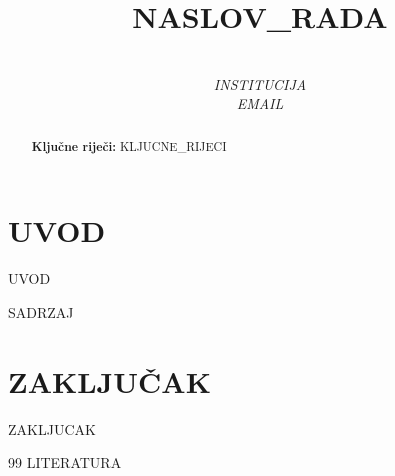 \documentclass[10pt,a4paper,twocolumn]{article}
\title{%
    \vspace{-1.5cm}%
    {\fontsize{16pt}{19pt}\selectfont\bfseries\MakeUppercase{{{NASLOV_RADA}}}}%
    \vspace{0.3cm}%
}
\author{%
    {\fontsize{12pt}{14pt}\selectfont {{IME_I_PREZIME}}}\\[2pt]
    {\small\textit{{{INSTITUCIJA}}}}\\[2pt]
    {\small\textit{{{EMAIL}}}}%
}
\date{}
\begin{document}
\maketitle
\thispagestyle{fancy}

\begin{abstract}

\vspace{0.3cm}
\noindent \textbf{Ključne riječi:} {{KLJUCNE_RIJECI}}
\end{abstract}

\vspace{0.5cm}


\section{UVOD}
{{UVOD}}

{{SADRZAJ}}

\section{ZAKLJUČAK}
{{ZAKLJUCAK}}

\begin{thebibliography}{99}
{{LITERATURA}}
\end{thebibliography}
\end{document}
